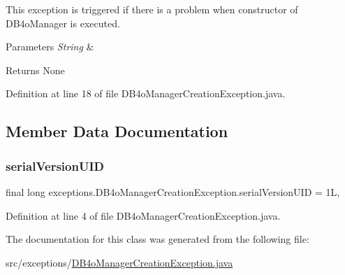 This exception is triggered if there is a problem when constructor of D\+B4o\+Manager is executed. 


\begin{DoxyParams}{Parameters}
{\em String} & \\
\hline
\end{DoxyParams}
\begin{DoxyReturn}{Returns}
None 
\end{DoxyReturn}


Definition at line 18 of file D\+B4o\+Manager\+Creation\+Exception.\+java.


\begin{DoxyCode}{0}

\end{DoxyCode}


\subsection{Member Data Documentation}
\mbox{\label{classexceptions_1_1DB4oManagerCreationException_af611b151185c866376c172feb883428a}} 
\subsubsection{\texorpdfstring{serialVersionUID}{serialVersionUID}}
{\footnotesize\ttfamily final long exceptions.\+D\+B4o\+Manager\+Creation\+Exception.\+serial\+Version\+U\+ID = 1L\hspace{0.3cm}{\ttfamily [static]}, {\ttfamily [private]}}



Definition at line 4 of file D\+B4o\+Manager\+Creation\+Exception.\+java.



The documentation for this class was generated from the following file\+:\begin{DoxyCompactItemize}
\item 
src/exceptions/\mbox{\hyperlink{DB4oManagerCreationException_8java}{D\+B4o\+Manager\+Creation\+Exception.\+java}}\end{DoxyCompactItemize}
